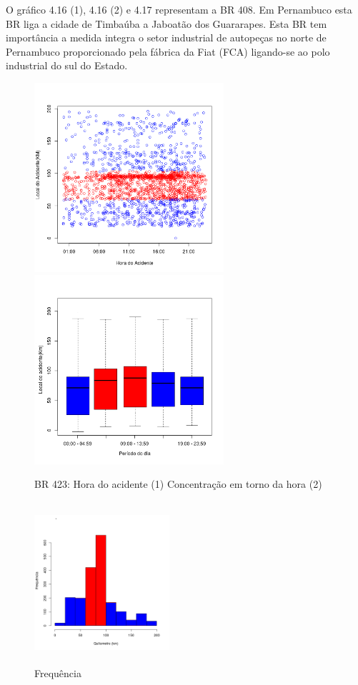 O gráfico 4.16 (1), 4.16 (2)  e 4.17 representam a BR 408. Em Pernambuco esta BR liga a cidade de Timbaúba a Jaboatão dos Guararapes. Esta BR tem importância a medida integra o setor industrial de autopeças no norte de Pernambuco proporcionado pela fábrica da Fiat (FCA) ligando-se ao polo industrial do sul do Estado. 
\pagebreak

\begin{figure}[h]
	\caption{BR 423: Hora do acidente (1)  Concentração em torno da hora (2)}
	\includegraphics[width=7cm,height=7cm]{Figuras/Preprocess/br423_1.png}
	\includegraphics[width=7cm,height=7cm]{Figuras/Preprocess/br423_2.png}
	
\end{figure}

\quad \quad
\begin{figure}[h]
	\centering
	\caption{ Frequência}
	\includegraphics[width=5cm,height=6cm]{Figuras/Preprocess/br423_3.png}
\end{figure}

